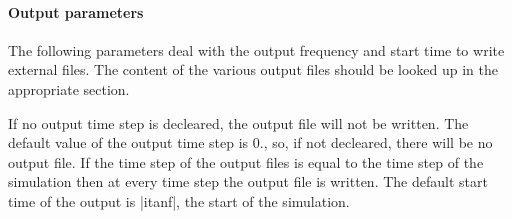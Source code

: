 \paragraph{Output parameters}

The following parameters deal with the output frequency
and start time to write external files. The content of the various
output files should be looked up in the appropriate section.

If no output time step is decleared, the output file will not be written.
The default value of the output time step is 0., so, if not decleared, there will be no output file. If the time step of the
output files is equal to the time step of the simulation then
at every time step the output file is written. The default start time
of the output is |itanf|, the start of the simulation.

\par

\par

